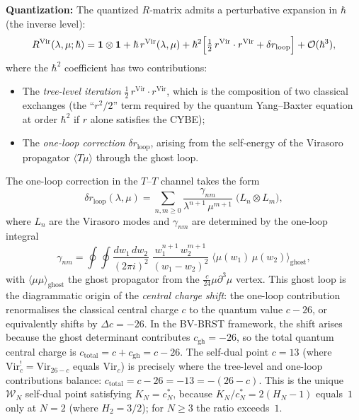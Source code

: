 \textbf{Quantization:} The quantized $R$-matrix admits a
perturbative expansion in $\hbar$ (the inverse level):
\begin{equation}
R^{\text{Vir}}(\lambda, \mu; \hbar)
= \mathbf{1} \otimes \mathbf{1}
 + \hbar\, r^{\text{Vir}}(\lambda,\mu)
 + \hbar^2 \Bigl[\tfrac{1}{2}\, r^{\text{Vir}} \cdot r^{\text{Vir}}
 + \delta r_{\text{loop}}\Bigr]
 + \mathcal{O}(\hbar^3),
\end{equation}
where the $\hbar^2$ coefficient has two contributions:
\begin{itemize}
\item The \emph{tree-level iteration}
$\tfrac{1}{2}\,r^{\text{Vir}} \cdot r^{\text{Vir}}$, which is
the composition of two classical exchanges (the ``$r^2/2$''
term required by the quantum Yang--Baxter equation at order
$\hbar^2$ if $r$ alone satisfies the CYBE);
\item The \emph{one-loop correction} $\delta r_{\text{loop}}$,
arising from the self-energy of the Virasoro propagator
$\langle T\mu \rangle$ through the ghost loop.
\end{itemize}

The one-loop correction in the $T$--$T$ channel takes the form
\begin{equation}
\delta r_{\text{loop}}(\lambda,\mu)
= \sum_{n,m \ge 0}
 \frac{\gamma_{nm}}{\lambda^{n+1}\,\mu^{m+1}}
 \;\bigl(L_n \otimes L_m\bigr),
\end{equation}
where $L_n$ are the Virasoro modes and $\gamma_{nm}$ are determined
by the one-loop integral
\[
\gamma_{nm}
= \oint \oint
 \frac{dw_1\, dw_2}{(2\pi i)^2}\;
 \frac{w_1^{n+1}\, w_2^{m+1}}{(w_1 - w_2)^2}
 \;\langle \mu(w_1)\, \mu(w_2) \rangle_{\text{ghost}},
\]
with $\langle \mu \mu \rangle_{\text{ghost}}$ the ghost propagator
from the $\tfrac{c}{24}\mu\partial^3\mu$ vertex. This ghost loop
is the diagrammatic origin of the \emph{central charge shift}:
the one-loop contribution renormalises the classical central charge
$c$ to the quantum value $c - 26$, or equivalently shifts by
$\Delta c = -26$. In the BV-BRST framework, the shift arises
because the ghost determinant contributes $c_{\text{gh}} = -26$,
so the total quantum central charge is $c_{\text{total}} = c + c_{\text{gh}} = c - 26$.
The self-dual point $c = 13$ (where
$\mathrm{Vir}_c^! = \mathrm{Vir}_{26-c}$ equals $\mathrm{Vir}_c$)
is precisely where the tree-level and one-loop contributions balance:
$c_{\text{total}} = c - 26 = -13 = -(26 - c)$. This is the unique
$\mathcal{W}_N$ self-dual point satisfying
$K_N = c^*_N$, because
$K_N/c^*_N = 2(H_N - 1)$ equals~$1$ only at $N = 2$ (where
$H_2 = 3/2$); for $N \ge 3$ the ratio exceeds~$1$.

